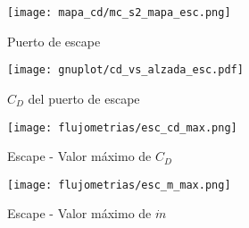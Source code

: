 \begin{figure}[h]
    \centering
    \texttt{[image: mapa\_cd/mc\_s2\_mapa\_esc.png]}
    \caption{Puerto de escape}\label{fig:mapa_cd_escape}
\end{figure}

\begin{figure}[h]
    \centering
    \texttt{[image: gnuplot/cd\_vs\_alzada\_esc.pdf]}
    \caption{$C_{D}$ del puerto de escape}\label{fig:cd_escape}
\end{figure}


\begin{figure}[h]
    \centering
    \texttt{[image: flujometrias/esc\_cd\_max.png]}
    \caption{Escape - Valor máximo de $C_{D}$}\label{fig:esc_cd_max}
\end{figure}

\begin{figure}[h]
    \centering
    \texttt{[image: flujometrias/esc\_m\_max.png]}
    \caption{Escape - Valor máximo de $\dot{m}$}\label{fig:esc_m_max}
\end{figure}
